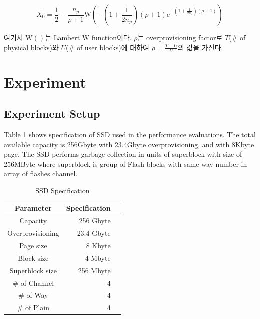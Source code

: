 \documentclass[letterpaper,twocolumn,10pt]{article}
\begin{document}
\begin{equation}
\label{analy_grd_unif_X0_rho}
X_0=\frac{1}{2}-\frac{n_p}{\rho+1}\mbox{W}\left( -(1+\frac{1}{2n_p})(\rho+1)e^{-(1+\frac{1}{2n_p})(\rho+1)}\right)
\end{equation}

여기서 $\mbox{W}()$는 Lambert W function\cite{Corless:BF02124750}이다. 
$\rho$는 overprovisioning factor로 $T$(\# of physical blocks)와 $U$(\# of user blocks)에 대하여 $\rho=\frac{T-U}{U}$의 값을 가진다.


\section{Experiment}

\subsection{Experiment Setup}
\label{subsec:exp_setup}


Table \ref{tab:ssd_info} shows specification of SSD used in the performance evaluations. The total available capacity is 256Gbyte with 23.4Gbyte overprovisioning, and with 8Kbyte page. The SSD performs garbage collection in units of superblock with size of 256MByte where superblock is group of Flash blocks with same way number in array of flashes channel.

\begin{table}[h]
\begin{center}
\begin{tabular}{|c|r|r|} \hline
Parameter			& Specification 				\\ \hline\hline
Capacity			& 256 Gbyte 				 	\\ \hline
Overprovisioning	& 23.4 Gbyte					\\ \hline
Page size			& 8 Kbyte						\\ \hline
Block size		& 4 Mbyte						\\ \hline
Superblock size	& 256 Mbyte					\\ \hline
\# of Channel		& 4 							\\ \hline
\# of Way			& 4 							\\ \hline
\# of Plain		& 4 							\\ \hline


\end{tabular}
\end{center}
\caption{SSD Specification}
\label{tab:ssd_info}
\end{table}
\end{document}

